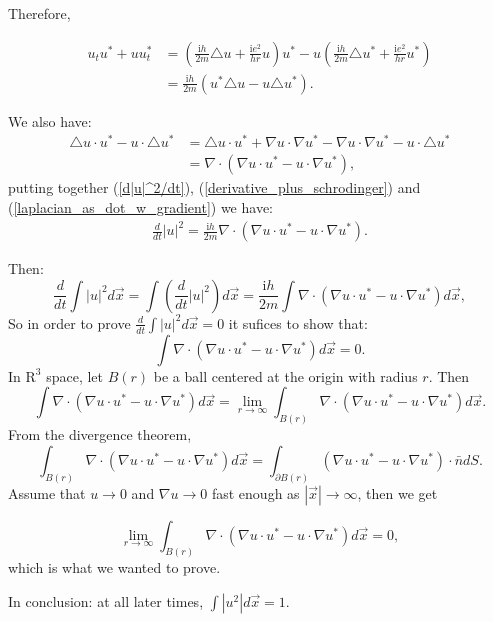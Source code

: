 \documentclass{article}
\begin{document}
		Therefore,

		\begin{align} \label{derivative_plus_schrodinger}
				u_{t}u^*+uu_{t}^*&=\left(\frac{\mathrm{i}h}{2m}\triangle u+\frac{\mathrm{i}e^2}{hr}u\right)u^*-u\left(\frac{\mathrm{i}h}{2m}\triangle u^*+\frac{\mathrm{i}e^2}{hr}u^*\right) \nonumber \\
			&= \frac{\mathrm{i}h}{2m}(u^*\triangle u -u\triangle u^*).
			\end{align}

		We also have:
		\begin{align} \label{laplacian_as_dot_w_gradient}
		\triangle u \cdot u^*-u\cdot\triangle u^*&= \triangle u \cdot u^*+ \nabla u\cdot \nabla u^*- \nabla u\cdot \nabla u^*- u\cdot\triangle u^* \nonumber \\
		&=\nabla \cdot (\nabla u \cdot u^* -u\cdot \nabla u^*),
		\end{align}
		putting together (\ref{d|u|^2/dt}), (\ref{derivative_plus_schrodinger}) and (\ref{laplacian_as_dot_w_gradient}) we have:
	\begin{align*}
		\frac{d}{dt}\left | u \right |^2 =\frac{\mathrm{i}h}{2m}\nabla \cdot (\nabla u \cdot u^* -u\cdot \nabla u^*).
	\end{align*}

	Then:
	\[
		\frac{d}{dt}\int \left | u \right |^2d\vec{x} = \int \left(\frac{d}{dt}\left | u \right |^2\right)d\vec{x} =\frac{\mathrm{i}h}{2m}\int\nabla \cdot (\nabla u \cdot u^* -u\cdot \nabla u^*)d\vec{x},
	\]
	So in order to prove $\frac{d}{dt}\int|u|^2d\vec{x}=0$ it sufices to show that:
	\[
		\int\nabla \cdot (\nabla u \cdot u^* -u\cdot \nabla u^*)d\vec{x}=0.
	\]
            In $\mathrm{R}^3$ space, let $B(r)$ be a ball centered at the origin with radius $r$.
		Then
		\[
			\int\nabla \cdot (\nabla u \cdot u^* -u\cdot \nabla u^*)d\vec{x} = \lim_{r \to \infty}\int_{B(r)}\nabla \cdot (\nabla u \cdot u^* -u\cdot \nabla u^*)d\vec{x}.
		\]
			From the divergence theorem,
			\[\int_{B(r)} \nabla \cdot (\nabla u \cdot u^* -u\cdot \nabla u^*)d\vec{x}= \int_{\partial B(r)}^{}(\nabla u \cdot u^* -u\cdot \nabla u^*) \cdot \bar{n} dS.	\]
			Assume that $u \to 0$ and $\nabla u \to 0$ fast enough as $\left | \vec{x} \right | \to \infty$, then we get
		
		\[ \lim_{r \to \infty}\int_{B(r)}^{} \nabla \cdot (\nabla u \cdot u^* -u\cdot \nabla u^*)d \vec{x } =0,\]
		which is what we wanted to prove.

		In conclusion: at all later times, $ \int \left | u^2 \right | d \vec{x } =1$.
		
\end{document}
